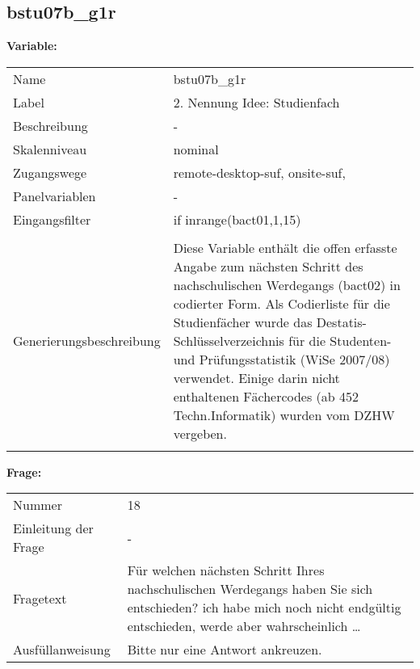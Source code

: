 	
	
	\subsection{bstu07b\_g1r}
	\label{subSection:bstu07b_g1r}

	\noindent\textbf{Variable:}\\
		\begin{tabular}{lL{11.3cm}}
			\label{tableVariable:bstu07b_g1r}
			Name & bstu07b\_g1r \\
			Label & 2. Nennung Idee: Studienfach \\
			Beschreibung & - \\
			Skalenniveau & nominal \\
			Zugangswege &
				remote-desktop-suf,
				onsite-suf,
 \\
			Panelvariablen & -
			 \\
			Eingangsfilter & if inrange(bact01,1,15) \\
 \\
					Generierungsbeschreibung & Diese Variable enthält die offen erfasste Angabe zum nächsten Schritt des nachschulischen Werdegangs (bact02) in codierter Form.  Als Codierliste für die Studienfächer wurde das Destatis-Schlüsselverzeichnis für die Studenten- und Prüfungsstatistik (WiSe 2007/08) verwendet. Einige darin nicht enthaltenen Fächercodes (ab 452 Techn.Informatik) wurden vom DZHW vergeben.
				 \\	
			 \\
		\end{tabular}

		\vspace*{1 cm}
		\noindent\textbf{Frage:}\\
		\begin{tabular}{lL{11.3cm}}
			\label{tableQuestion:bstu07b_g1r}
			Nummer & 18 \\
			Einleitung der Frage & - \\
			Fragetext & Für welchen nächsten Schritt Ihres nachschulischen Werdegangs haben Sie sich entschieden?
ich habe mich noch nicht endgültig entschieden, werde aber wahrscheinlich … \\
			Ausfüllanweisung & Bitte nur eine Antwort ankreuzen. \\
		\end{tabular}






